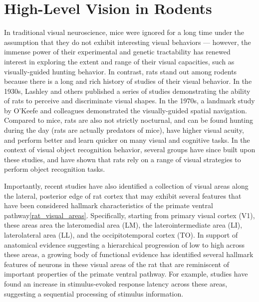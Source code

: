 \section{High-Level Vision in Rodents}
In traditional visual neuroscience, mice were ignored for a long time under the assumption that they do not exhibit interesting visual behaviors --- however, the immense power of their experimental and genetic tractability has renewed interest in exploring the extent and range of their visual capacities, such as visually-guided hunting behavior\cite{Hoy2016, Meyer2020, Michaiel2020}. In contrast, rats stand out among rodents because there is a long and rich history of studies of their visual behavior. In the 1930s, Lashley and others published a series of studies demonstrating the ability of rats to perceive and discriminate visual shapes\cite{Lashley1912, Lashlsey1930, Lashley1938}. In the 1970s, a landmark study by O'Keefe and colleagues demonstrated the visually-guided spatial navigation\cite{OKeefe1971}. Compared to mice, rats are also not strictly nocturnal, and can be found hunting during the day (rats are actually predators of mice), have higher visual acuity\cite{Prusky2000}, and perform better and learn quicker on many visual and cognitive tasks\cite{Whishaw1995, Wishaw1996}. In the context of visual object recognition behavior, several groups have since built upon these studies, and have shown that rats rely on a range of visual strategies to perform object recognition tasks\cite{Zoccolan2009, Tafazoli2012Transformation-TolerantPriming, Vermaercke2012, Alemi-Neissi2013MultifeaturalRecognition, Vinken2014}.

Importantly, recent studies have also identified a collection of visual areas along the lateral, posterior edge of rat cortex that may exhibit several features that have been considered hallmark characteristics of the primate ventral pathway\ref{rat_visual_areas}. Specifically, starting from primary visual cortex (V1), these areas area the lateromedial area (LM), the laterointermediate area (LI), laterolateral area (LL), and the occipitotemporal
cortex (TO). In support of anatomical evidence suggesting a hierarchical progression of low to high across these areas\cite{Coogan1993, Wang2012NetworkCortex, DSouza2020CanonicalHierarchy}, a growing body of functional evidence has identified several hallmark features of neurons in these visual areas of the rat that are reminiscent of important properties of the primate ventral pathway. For example, studies have found an increase in stimulus-evoked response latency across these areas\cite{Vermaercke2014, DSouza2020}, suggesting a sequential processing of stimulus information.

